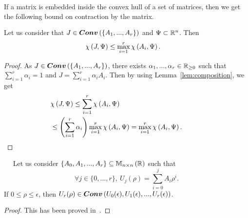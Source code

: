 %
If a matrix is embedded inside the convex hull of a set of matrices,
then we get the following bound on contraction by the matrix.
%
\begin{lemma}
Let us consider that $J\in\bm{Conv}\left(\left\{A_1,...,A_r\right\}\right)$ and
$\Psi\subset\mathbb{R}^n$.  Then
%
\begin{align*}
& \chi\left(J,\Psi\right)\leq\max_{i=1}^r\chi\left(A_i,\Psi\right).
\end{align*}
%
\end{lemma}
%
\begin{proof}
As $J\in\bm{Conv}\left(\left\{A_1,...,A_r\right\}\right)$, there exists
$\alpha_1,...,\alpha_r\in\mathbb{R}_{\geq 0}$ such that
$\sum_{i=1}^r\alpha_i=1$ and $J=\sum_{i=1}^r\alpha_iA_i$.  Then by
using Lemma~\ref{lem:composition}, we get
%
\begin{align*}
  & \chi\left(J,\Psi\right)\leq\sum_{i=1}^r\chi\left(A_i,\Psi\right)\\
  & \leq \left(\sum_{i=1}^r\alpha_i\right)\max_{i=1}^r\chi\left(A_i,\Psi\right)=\max_{i=1}^r\chi\left(A_i,\Psi\right).\hspace{3em}\qedhere
\end{align*}
%
\end{proof}
%
\begin{lem}~\label{lem:convex}~\cite{todo}
Let us consider $\left\{A_0,A_1,...,A_r\right\}\subseteq\mathbb{M}_{n\times n}\left(\mathbb{R}\right)$ such
that 
%
\[
\forall j\in\{0,...,r\},~ U_j(\rho)=\sum_{i=0}^jA_i\rho^i.
\]
%
If
$0\leq\rho\leq \epsilon$, then $U_r(\rho)\in
\bm{Conv}\left(U_0(\epsilon),U_1(\epsilon),...,U_r(\epsilon)\right)$.
\end{lem}
\begin{proof}
This has been proved in~\cite{todo}.
\end{proof}

